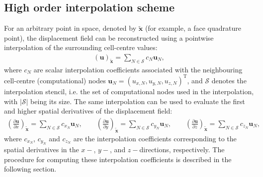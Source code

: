 \documentclass[review,3p]{elsarticle}
\newcommand{\bb}{\boldsymbol}
\begin{document}
\subsection{High order interpolation scheme}
\label{sec:ho_scheme}
%
For an arbitrary point in space, denoted by $\tilde{\bb{x}}$ (for example, a face quadrature point), the displacement field can be reconstructed using a pointwise interpolation of the surrounding cell-centre values:
%
\begin{eqnarray}\label{eq:interp}
	(\bb{u})_{\tilde{\bb{x}}} = \sum_{N \in \mathcal{S}}c_N \bb{u}_N,
\end{eqnarray}
%
where $c_N$ are scalar interpolation coefficients associated with the neighbouring cell-centre (computational) nodes $\bb{u}_N=(u_{x,N}, u_{y,N}, u_{z,N})^{\mathrm{T}}$, and $\mathcal{S}$ denotes the interpolation stencil, i.e. the set of computational nodes used in the interpolation, with $|\mathcal{S}|$ being its size.
The same interpolation can be used to evaluate the first and higher spatial derivatives of the displacement field:
%
\begin{eqnarray}\label{eq:derInterp}
	\left(\frac{\partial \bb{u}}{\partial x}\right)_{\tilde{\bb{x}}}=\sum_{N \in \mathcal{S}}c_{x_N} \bb{u}_N, \qquad
	\left(\frac{\partial \bb{u}}{\partial y}\right)_{\tilde{\bb{x}}}=\sum_{N \in \mathcal{S}}c_{y_N} \bb{u}_N, \qquad
	\left(\frac{\partial \bb{u}}{\partial z}\right)_{\tilde{\bb{x}}}=\sum_{N \in \mathcal{S}}c_{z_N} \bb{u}_N,
\end{eqnarray}
%
where $c_{x_N}$, $c_{y_N}$ and $c_{z_N}$ are the interpolation coefficients corresponding to the spatial derivatives in the $x-$, $y-$, and $z-$directions, respectively.
The procedure for computing these interpolation coefficients is described in the following section.
%
\end{document}

